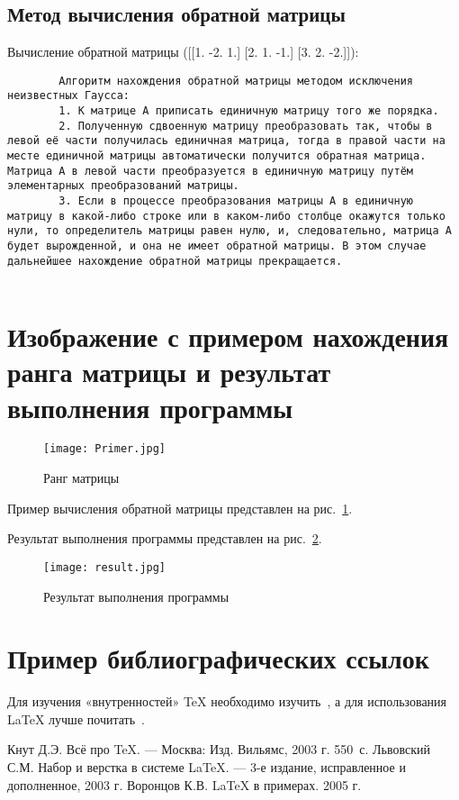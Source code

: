 \documentclass{article}
\begin{document}
	\subsection{Метод вычисления обратной матрицы}
	\label{sec:mathexample}
	
	Вычисление обратной матрицы
	([[1. -2.  1.]
	[2.  1. -1.]
	[3.  2. -2.]]):
	\begin{verbatim}
		Алгоритм нахождения обратной матрицы методом исключения неизвестных Гаусса:
		1. К матрице A приписать единичную матрицу того же порядка.
		2. Полученную сдвоенную матрицу преобразовать так, чтобы в левой её части получилась единичная матрица, тогда в правой части на месте единичной матрицы автоматически получится обратная матрица. Матрица A в левой части преобразуется в единичную матрицу путём элементарных преобразований матрицы.
		3. Если в процессе преобразования матрицы A в единичную матрицу в какой-либо строке или в каком-либо столбце окажутся только нули, то определитель матрицы равен нулю, и, следовательно, матрица A будет вырожденной, и она не имеет обратной матрицы. В этом случае дальнейшее нахождение обратной матрицы прекращается.
		
	\end{verbatim}
	
	\section{Изображение с примером нахождения ранга матрицы и результат выполнения программы}
	\label{sec:picexample}
	\begin{figure}[h]
		\centering
		\texttt{[image: Primer.jpg]}
		\caption{Ранг матрицы}\label{fig:par}
	\end{figure}
	Пример вычисления обратной матрицы представлен на рис.~\ref{fig:par}.
	
	Результат выполнения программы представлен на рис.~\ref{fig:par2}.
	\label{sec:picexample}
	\begin{figure}[H]
		\centering
		\texttt{[image: result.jpg]}
		\caption{Результат выполнения программы}\label{fig:par2}
	\end{figure}
	
	
	
	\section{Пример библиографических ссылок}
	
	Для изучения «внутренностей» \TeX{} необходимо 
	изучить~\cite{Knuth-2003}, а для использования \LaTeX{} лучше
	почитать~\cite{Lvovsky-2003, Voroncov-2005}.
	
	\begin{thebibliography}{9}
		Кнут Д.Э. Всё про \TeX. \newblock --- Москва: Изд. Вильямс, 2003 г. 550~с.
		Львовский С.М. Набор и верстка в системе \LaTeX{}. \newblock --- 3-е издание, исправленное и дополненное, 2003 г.
		Воронцов К.В. \LaTeX{} в примерах. 2005 г.
	\end{thebibliography}
	
\end{document}
